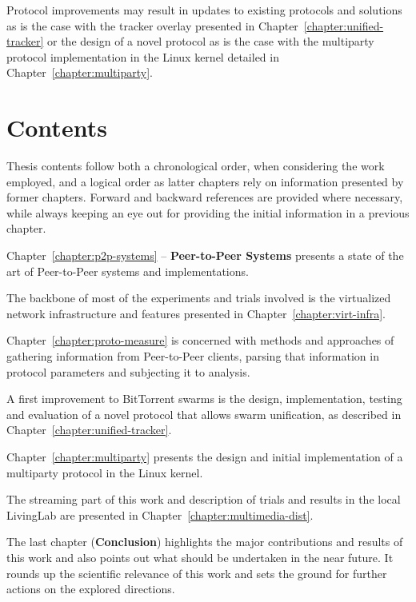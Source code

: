 Protocol improvements may result in updates to existing protocols and
solutions as is the case with the tracker overlay presented in
Chapter~\ref{chapter:unified-tracker} or the design of a novel protocol as is
the case with the multiparty protocol implementation in the Linux kernel
detailed in Chapter~\ref{chapter:multiparty}.

\section{Contents}
\label{sec:intro:contents}

Thesis contents follow both a chronological order, when considering the work
employed, and a logical order as latter chapters rely on information presented
by former chapters. Forward and backward references are provided where
necessary, while always keeping an eye out for providing the initial
information in a previous chapter.

Chapter~\ref{chapter:p2p-systems} -- \textbf{Peer-to-Peer Systems} presents a
state of the art of Peer-to-Peer systems and implementations.

The backbone of most of the experiments and trials involved is the
virtualized network infrastructure and features presented in
Chapter~\ref{chapter:virt-infra}.

Chapter~\ref{chapter:proto-measure} is concerned with methods and approaches
of gathering information from Peer-to-Peer clients, parsing that information
in protocol parameters and subjecting it to analysis.

A first improvement to BitTorrent swarms is the design, implementation,
testing and evaluation of a novel protocol that allows swarm unification, as
described in Chapter~\ref{chapter:unified-tracker}.

Chapter~\ref{chapter:multiparty} presents the design and initial
implementation of a multiparty protocol in the Linux kernel.

The streaming part of this work and description of trials and results in the
local LivingLab are presented in Chapter~\ref{chapter:multimedia-dist}.

The last chapter (\textbf{Conclusion}) highlights the major contributions and
results of this work and also points out what should be undertaken in the near
future. It rounds up the scientific relevance of this work and sets the ground
for further actions on the explored directions.
